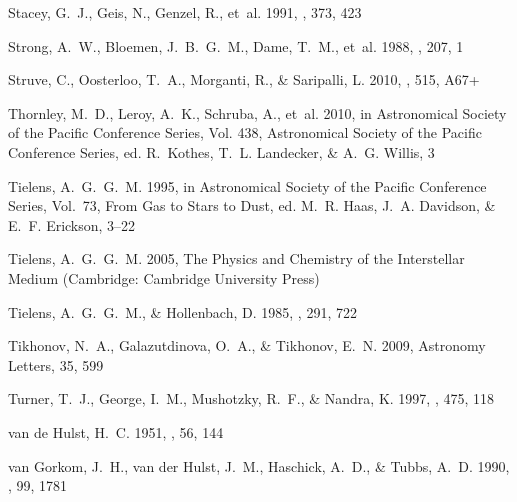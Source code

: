 \begin{thebibliography}{133}
{Stacey}, G.~J., {Geis}, N., {Genzel}, R., {et~al.} 1991, \apj, 373, 423

{Strong}, A.~W., {Bloemen}, J.~B.~G.~M., {Dame}, T.~M., {et~al.} 1988, \aap,
  207, 1

{Struve}, C., {Oosterloo}, T.~A., {Morganti}, R., \& {Saripalli}, L. 2010,
  \aap, 515, A67+

{Thornley}, M.~D., {Leroy}, A.~K., {Schruba}, A., {et~al.} 2010, in
  Astronomical Society of the Pacific Conference Series, Vol. 438, Astronomical
  Society of the Pacific Conference Series, ed. R.~{Kothes}, T.~L. {Landecker},
  \& A.~G. {Willis}, 3

{Tielens}, A.~G.~G.~M. 1995, in Astronomical Society of the Pacific Conference
  Series, Vol.~73, From Gas to Stars to Dust, ed. M.~R. {Haas}, J.~A.
  {Davidson}, \& E.~F. {Erickson}, 3--22

{Tielens}, A.~G.~G.~M. 2005, {The Physics and Chemistry of the Interstellar
  Medium} (Cambridge: Cambridge University Press)

{Tielens}, A.~G.~G.~M., \& {Hollenbach}, D. 1985, \apj, 291, 722

{Tikhonov}, N.~A., {Galazutdinova}, O.~A., \& {Tikhonov}, E.~N. 2009, Astronomy
  Letters, 35, 599

{Turner}, T.~J., {George}, I.~M., {Mushotzky}, R.~F., \& {Nandra}, K. 1997,
  \apj, 475, 118

{van de Hulst}, H.~C. 1951, \aj, 56, 144

{van Gorkom}, J.~H., {van der Hulst}, J.~M., {Haschick}, A.~D., \& {Tubbs},
  A.~D. 1990, \aj, 99, 1781


\end{thebibliography}
